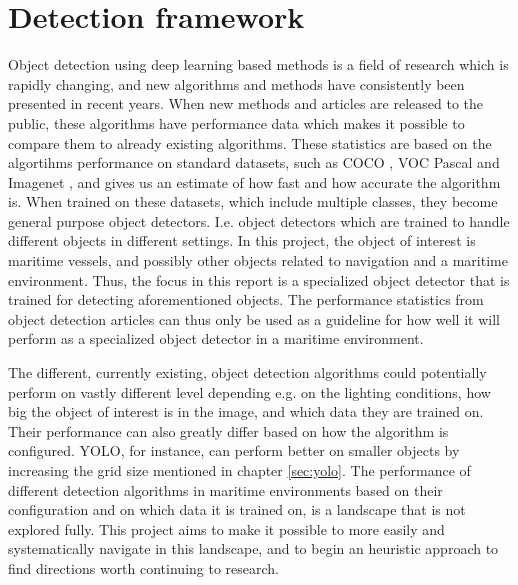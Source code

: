 \section{Detection framework}
Object detection using deep learning based methods is a field of research which is rapidly changing, and new algorithms and methods have consistently been presented in recent years. When new methods and articles are released to the public, these algorithms have performance data which makes it possible to compare them to already existing algorithms. These statistics are based on the algortihms performance on standard datasets, such as COCO \citep{COCO}, VOC Pascal \citep{Everingham2007} \citep{Everingham2012} and Imagenet \citep{Imagenet}, and gives us an estimate of how fast and how accurate the algorithm is. When trained on these datasets, which include multiple classes, they become general purpose object detectors. I.e. object detectors which are trained to handle different objects in different settings. In this project, the object of interest is maritime vessels, and possibly other objects related to navigation and a maritime environment. Thus, the focus in this report is a specialized object detector that is trained for detecting aforementioned objects. The performance statistics from object detection articles can thus only be used as a guideline for how well it will perform as a specialized object detector in a maritime environment. 

\vspace{3mm}

The different, currently existing, object detection algorithms could potentially perform on vastly different level depending e.g. on the lighting conditions, how big the object of interest is in the image, and which data they are trained on. Their performance can also greatly differ based on how the algorithm is configured. YOLO, for instance, can perform better on smaller objects by increasing the grid size mentioned in chapter \ref{sec:yolo}. The performance of different detection algorithms in maritime environments based on their configuration and on which data it is trained on, is a landscape that is not explored fully. This project aims to make it possible to more easily and systematically navigate in this landscape, and to begin an heuristic approach to find directions worth continuing to research.

